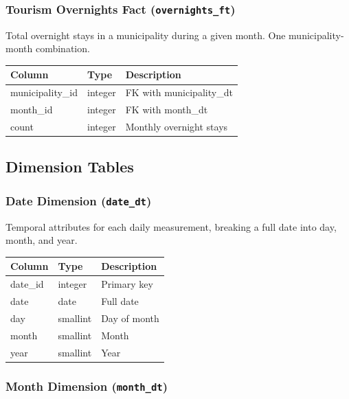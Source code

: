 \documentclass{article}
\begin{document}
	\subsubsection{Tourism Overnights Fact (\textbf{\texttt{overnights\_ft}})}
	
	Total overnight stays in a municipality during a given month. One municipality-month combination.
	\begin{table}[H]
		\centering
		\begin{tabular}{lll}
			\hline
			Column & Type & Description \\
			\hline
			municipality\_id & integer & FK with municipality\_dt \\
			month\_id & integer & FK with month\_dt \\
			count & integer & Monthly overnight stays \\
			\hline
		\end{tabular}
	\end{table}
	
	\subsection{Dimension Tables}
	
	\subsubsection{Date Dimension (\textbf{\texttt{date\_dt}})}
	
	Temporal attributes for each daily measurement, breaking a full date into day, month, and year.
	
	\begin{table}[H]
		\centering
		\begin{tabular}{lll}
			\hline
			Column & Type & Description \\
			\hline
			date\_id & integer & Primary key \\
			date & date & Full date \\
			day & smallint & Day of month \\
			month & smallint & Month \\
			year & smallint & Year \\
			\hline
		\end{tabular}
	\end{table}
	
	\subsubsection{Month Dimension (\textbf{\texttt{month\_dt}})}
	
\end{document}
